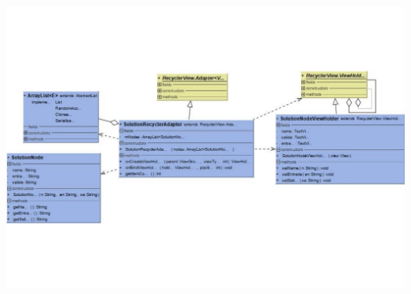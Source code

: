 \thispagestyle{empty}
{%
	\label{fig:solution_recycler_diagram}
	\centering
	\includegraphics[scale=.95,angle=90]{imagenes/solution_recycler_class_diagram.pdf}
	\par
}
\restoregeometry



